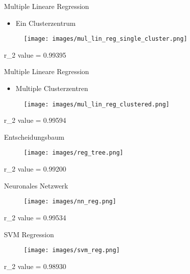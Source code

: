 \begin{frame}{Multiple Lineare Regression}
    \begin{itemize}
        \item Ein Clusterzentrum
    \end{itemize}
    \begin{figure}
        \centering
        \texttt{[image: images/mul\_lin\_reg\_single\_cluster.png]}
        \label{fig:enter-label}
    \end{figure}
    \centering
        r_2 value = 0.99395
\end{frame}

\begin{frame}{Multiple Lineare Regression}
    \begin{itemize}
        \item Multiple Clusterzentren
    \end{itemize}
    \begin{figure}
        \centering
        \texttt{[image: images/mul\_lin\_reg\_clustered.png]}
        \label{fig:enter-label}
    \end{figure}
    \centering
        r_2 value = 0.99594
\end{frame}

\begin{frame}{Entscheidungsbaum}
    \begin{figure}
        \centering
        \texttt{[image: images/reg\_tree.png]}
        \label{fig:enter-label}
    \end{figure}
    \centering
        r_2 value = 0.99200
\end{frame}

\begin{frame}{Neuronales Netzwerk}
    \begin{figure}
        \centering
        \texttt{[image: images/nn\_reg.png]}
        \label{fig:enter-label}
    \end{figure}
    \centering
        r_2 value = 0.99534
\end{frame}

\begin{frame}{SVM Regression}
    \begin{figure}
        \centering
        \texttt{[image: images/svm\_reg.png]}
        \label{fig:enter-label}
    \end{figure}
    \centering
        r_2 value = 0.98930
\end{frame}

